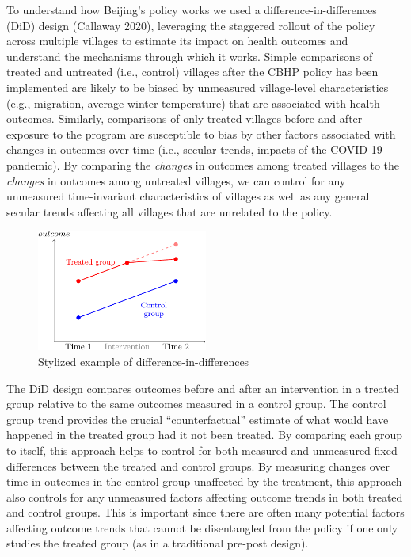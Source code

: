 \documentclass[
  letterpaper,
  DIV=11,
  numbers=noendperiod]{scrartcl}
\begin{document}
To understand how Beijing's policy works we used a
difference-in-differences (DiD) design (Callaway 2020), leveraging the
staggered rollout of the policy across multiple villages to estimate its
impact on health outcomes and understand the mechanisms through which it
works. Simple comparisons of treated and untreated (i.e., control)
villages after the CBHP policy has been implemented are likely to be
biased by unmeasured village-level characteristics (e.g., migration,
average winter temperature) that are associated with health outcomes.
Similarly, comparisons of only treated villages before and after
exposure to the program are susceptible to bias by other factors
associated with changes in outcomes over time (i.e., secular trends,
impacts of the COVID-19 pandemic). By comparing the \emph{changes} in
outcomes among treated villages to the \emph{changes} in outcomes among
untreated villages, we can control for any unmeasured time-invariant
characteristics of villages as well as any general secular trends
affecting all villages that are unrelated to the policy.

\begin{figure}[H]

{\centering \includegraphics[width=0.5\textwidth,height=\textheight]{hei-report_files/figure-pdf/fig-didfig-1.pdf}

}

\caption{\label{fig-didfig}Stylized example of
difference-in-differences}

\end{figure}

The DiD design compares outcomes before and after an intervention in a
treated group relative to the same outcomes measured in a control group.
The control group trend provides the crucial ``counterfactual'' estimate
of what would have happened in the treated group had it not been
treated. By comparing each group to itself, this approach helps to
control for both measured and unmeasured fixed differences between the
treated and control groups. By measuring changes over time in outcomes
in the control group unaffected by the treatment, this approach also
controls for any unmeasured factors affecting outcome trends in both
treated and control groups. This is important since there are often many
potential factors affecting outcome trends that cannot be disentangled
from the policy if one only studies the treated group (as in a
traditional pre-post design).
\end{document}
